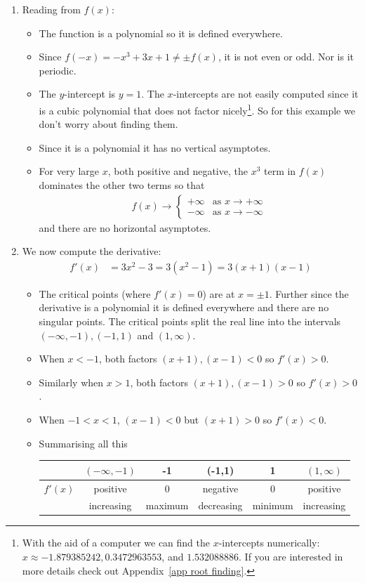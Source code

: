 \begin{eg}[Sketch $f(x)=x^3-3x+1$]\label{APPsketchA}

\begin{enumerate}[(1)]
\item Reading from $f(x)$:
\begin{itemize}
 \item The function is a polynomial so it is defined everywhere.
\item Since $f(-x) = -x^3+3x+1 \neq \pm f(x)$, it is not even or odd. Nor is it periodic.
\item The $y$-intercept is $y=1$. The $x$-intercepts are not easily computed since it is
a cubic polynomial that does not factor nicely\footnote{With the aid of a computer we
can find the $x$-intercepts numerically: $x\approx -1.879385242, 0.3472963553$, and
$1.532088886$. If you are interested in more details check out
Appendix~\ref{app root finding}.}. So for this example we don't worry
about finding them.
\item Since it is a polynomial it has no vertical asymptotes.
\item For very large $x$, both positive and negative,
the $x^3$ term in $f(x)$ dominates the other two terms so that
\begin{align*}
f(x)\rightarrow\begin{cases}+\infty &\text{as }x\rightarrow+\infty \\
                            -\infty &\text{as }x\rightarrow-\infty
                \end{cases}
\end{align*}
and there are no horizontal asymptotes.
\end{itemize}


\item We now compute the derivative:
\begin{align*}
f'(x) &= 3x^2-3 = 3(x^2-1)=3(x+1)(x-1)
\end{align*}
\begin{itemize}
 \item The critical points (where $f'(x)=0$) are at $x=\pm 1$. Further since the
derivative is a polynomial it is defined everywhere and there are no singular points.
The critical points split the real line into the intervals $(-\infty,-1),(-1,1)$
and $(1,\infty)$.
\item When $x<-1$, both factors $(x+1),(x-1)<0$ so $f'(x)>0$.
\item Similarly when $x>1$, both factors $(x+1),(x-1)>0$ so $f'(x)>0$.
\item When $-1<x<1$, $(x-1)<0$ but $(x+1)>0$ so $f'(x)<0$.
\item Summarising all this
\begin{center}
 \begin{tabular}{|c|c||c||c||c||c|}
\hline
  & $(-\infty,-1)$ & -1 & (-1,1) & 1 & $(1,\infty)$\\
\hline
$f'(x)$  & positive  & 0 & negative & 0 & positive \\
\hline
 & increasing & maximum & decreasing & minimum & increasing \\
\hline
 \end{tabular}
\end{center}


\end{itemize}
\end{enumerate}
\end{eg}
